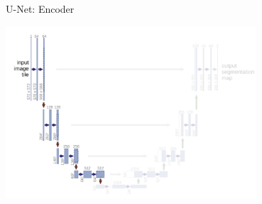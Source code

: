 \documentclass[serif, aspectratio=169]{beamer}
\begin{document}
\begin{frame}{U-Net: Encoder}

    \begin{center}
        \includegraphics[width=0.7\textwidth]{pic/Unet-Encoder1.png} 
    \end{center}
\end{frame}
\end{document}
